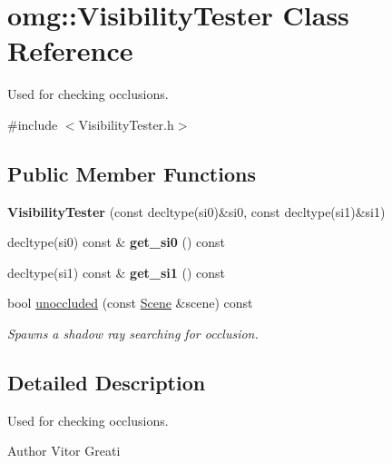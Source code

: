 \hypertarget{classomg_1_1_visibility_tester}{}\section{omg\+::Visibility\+Tester Class Reference}
\label{classomg_1_1_visibility_tester}


Used for checking occlusions.  




{\ttfamily \#include $<$Visibility\+Tester.\+h$>$}

\subsection*{Public Member Functions}
\begin{DoxyCompactItemize}
\item 
\mbox{\label{classomg_1_1_visibility_tester_acf9a1f3043542bfcaebae91b45ee5bd5}} 
{\bfseries Visibility\+Tester} (const decltype(si0)\&si0, const decltype(si1)\&si1)
\item 
\mbox{\label{classomg_1_1_visibility_tester_a312ed5f356f2a5bd6ce823560d853a99}} 
decltype(si0) const  \& {\bfseries get\+\_\+si0} () const
\item 
\mbox{\label{classomg_1_1_visibility_tester_a9bb6292885c4627343d6f2f1ab489b47}} 
decltype(si1) const  \& {\bfseries get\+\_\+si1} () const
\item 
bool \mbox{\hyperlink{classomg_1_1_visibility_tester_ac2f4eda3866795981b48f4db367255ac}{unoccluded}} (const \mbox{\hyperlink{classomg_1_1_scene}{Scene}} \&scene) const
\begin{DoxyCompactList}\small\item\em Spawns a shadow ray searching for occlusion. \end{DoxyCompactList}\end{DoxyCompactItemize}


\subsection{Detailed Description}
Used for checking occlusions. 

\begin{DoxyAuthor}{Author}
Vitor Greati 
\end{DoxyAuthor}


